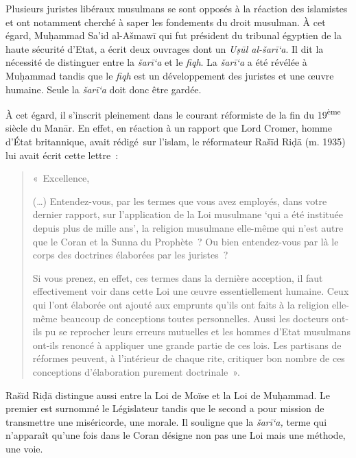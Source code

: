 
Plusieurs juristes libéraux musulmans se sont opposés à la réaction des
islamistes et ont notamment cherché à saper les fondements du droit
musulman. À cet égard, Muḥammad Sa'id al-Ašmawī qui fut président du
tribunal égyptien de la haute sécurité d'Etat, a écrit deux ouvrages
dont un \emph{Uṣūl al-šarī`a}. Il dit la nécessité de distinguer entre
la \emph{šarī`a} et le \emph{fiqh}. La \emph{šarī`a} a été révélée à
Muḥammad tandis que le \emph{fiqh} est un développement des juristes et
une œuvre humaine. Seule la \emph{šarī`a} doit donc être gardée.

À cet égard, il s'inscrit pleinement dans le courant réformiste de la
fin du 19\textsuperscript{ème} siècle du Manār. En effet, en réaction à
un rapport que Lord Cromer, homme d'État britannique, avait rédigé~sur
l'islam, le réformateur Rašīd Riḍā (m. 1935) lui avait écrit cette
lettre~:

\begin{quote}
«~Excellence,

(\ldots) Entendez-vous, par les termes que vous avez employés, dans
votre dernier rapport, sur l'application de la Loi musulmane `qui a été
instituée depuis plus de mille ans', la religion musulmane elle-même qui
n'est autre que le Coran et la Sunna du Prophète~? Ou bien entendez-vous
par là le corps des doctrines élaborées par les juristes~?

Si vous prenez, en effet, ces termes dans la dernière acception, il faut
effectivement voir dans cette Loi une œuvre essentiellement humaine.
Ceux qui l'ont élaborée ont ajouté aux emprunts qu'ils ont faits à la
religion elle-même beaucoup de conceptions toutes personnelles. Aussi
les docteurs ont-ils pu se reprocher leurs erreurs mutuelles et les
hommes d'Etat musulmans ont-ils renoncé à appliquer une grande partie de
ces lois. Les partisans de réformes peuvent, à l'intérieur de chaque
rite, critiquer bon nombre de ces conceptions d'élaboration purement
doctrinale~».
\end{quote}

Rašīd Riḍā distingue aussi entre la Loi de Moïse et la Loi de Muḥammad.
Le premier est surnommé le Législateur tandis que le second a pour
mission de transmettre une miséricorde, une morale. Il souligne que la
\emph{šarī`a,} terme qui n'apparaît qu'une fois dans le Coran désigne
non pas une Loi mais une méthode, une voie.

